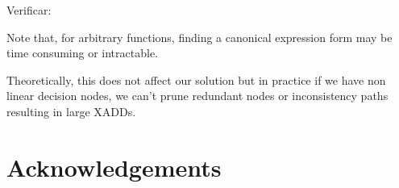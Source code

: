 \documentclass[twoside,11pt]{article}
\begin{document}
Verificar:

Note that, for arbitrary functions, finding a canonical  expression form may be time consuming or intractable.

Theoretically, this does not affect our solution but in practice if we have non linear decision nodes, we can't prune redundant nodes or inconsistency paths resulting in large XADDs.


\section*{Acknowledgements}


\vskip 0.2in


\end{document}
